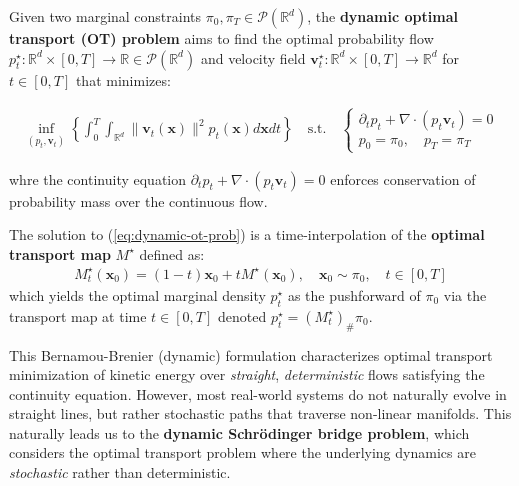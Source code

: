 \documentclass{article}
\newcommand{\boldtext}[1]{\textbf{\textcolor{MyGreen}{#1}}}
\begin{document}
\begin{definition}\label{def:dynamic-ot-problem}
    Given two marginal constraints $\pi_0, \pi_T\in \mathcal{P}(\mathbb{R}^d)$, the \textbf{dynamic optimal transport (OT) problem} aims to find the optimal probability flow $p^\star_t:\mathbb{R}^d\times[0,T]\to \mathbb{R}\in \mathcal{P}(\mathbb{R}^d)$ and velocity field $\boldsymbol{v}^\star_t:\mathbb{R}^d\times[0,T]\to \mathbb{R}^d$ for $t\in [0,T]$ that minimizes:
    \begin{small}
    \begin{align}
        \inf_{(p_t, \boldsymbol{v}_t)}\left\{\int_0^T\int_{\mathbb{R}^d}\|\boldsymbol{v}_t(\boldsymbol{x})\| ^2p_t(\boldsymbol{x})d\boldsymbol{x}dt\right\} \quad\text{s.t.}\quad\begin{cases}
            \partial_tp_t+\nabla\cdot(p_t\boldsymbol{v}_t)=0\\
            p_0=\pi_0, \quad p_T=\pi_T
        \end{cases}\tag{Dynamic OT Problem}\label{eq:dynamic-ot-prob}
    \end{align}
    \end{small}
    whre the continuity equation $\partial_tp_t+\nabla\cdot(p_t\boldsymbol{v}_t)=0$ enforces conservation of probability mass over the continuous flow.
\end{definition}
The solution to (\ref{eq:dynamic-ot-prob}) is a time-interpolation of the \boldtext{optimal transport map} $M^\star$ defined as:
\begin{align}
    M^\star_t(\boldsymbol{x}_0) =(1-t) \boldsymbol{x}_0+tM^\star(\boldsymbol{x}_0), \quad  \boldsymbol{x}_0\sim \pi_0, \quad t\in [0,T]\tag{Optimal Transport Map}
\end{align}
which yields the optimal marginal density $p^\star_t$ as the pushforward of $\pi_0$ via the transport map at time $t\in [0,T]$ denoted $p^\star_t=(M_t^\star)_{\#}\pi_0$.

This Bernamou-Brenier (dynamic) formulation characterizes optimal transport minimization of kinetic energy over \textit{straight}, \textit{deterministic} flows satisfying the continuity equation. However, most real-world systems do not naturally evolve in straight lines, but rather stochastic paths that traverse non-linear manifolds. This naturally leads us to the \textbf{dynamic Schrödinger bridge problem}, which considers the optimal transport problem where the underlying dynamics are \textit{stochastic} rather than deterministic. 
\end{document}
